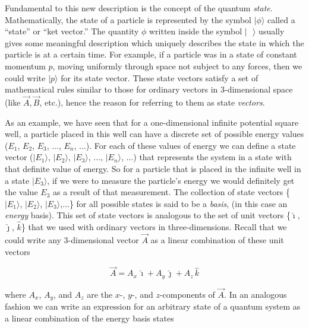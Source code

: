 Fundamental to this new description is the concept of the quantum {\em
state}.  Mathematically, the state of a particle is represented by the
symbol $|\mbox{$\phi$}\rangle$ called a ``state'' or ``ket vector.''
The quantity $\phi$ written inside the symbol $|\mbox{\ \ }\rangle$
usually gives some meaningful description which uniquely describes the
state in which the particle is at a certain time.  For example, if a
particle was in a state of constant momentum $p$, moving uniformly through
space not subject to any forces, then we could write $|\mbox{$p$}\rangle$
for its state vector. 
These state vectors satisfy a set of mathematical
rules similar to those for ordinary vectors in 3-dimensional space
(like $\vec{A}, \vec{B}$, etc.), hence the reason for referring to them
as state {\em vectors}.

As an example, we have seen that for a one-dimensional infinite potential
square well, a particle placed in this well can have a discrete set of
possible energy values ($E_1$, $E_2$, $E_3$, $\ldots$, $E_n$, $\ldots$).
For each of these values of energy we can define a state vector
($|\mbox{$E_1$}\rangle$, $|\mbox{$E_2$}\rangle$, $|\mbox{$E_3$}\rangle$,
$\ldots$, $|\mbox{$E_n$}\rangle$, $\ldots$) that represents the system
in a state with that definite value of energy.  So for a particle that
is placed in the infinite well in a state $|\mbox{$E_3$}\rangle$,
if we were to measure the particle's energy we would definitely get
the value $E_3$ as a result of that measurement.  The collection
of state vectors \{$|\mbox{$E_1$}\rangle$, $|\mbox{$E_2$}\rangle$,
$|\mbox{$E_3$}\rangle$,$\ldots$\} for all possible states is said to be
a {\em basis}, (in this case an {\em energy} basis).  This set of state
vectors is analogous to the set of unit vectors \{$\hat{\imath}$, 
$\hat{\jmath}$,
$\hat{k}$\} that we used with ordinary vectors in three-dimensions. Recall
that we could write any 3-dimensional vector $\vec{A}$ as a linear
combination of these unit vectors

\begin{equation}
\vec{A} = A_x\, \hat{\imath}  + A_y\, \hat{\jmath} + A_z\, \hat{k}
\end{equation}

\noindent where $A_x$, $A_y$, and $A_z$ are the $x$-, $y$-, and
$z$-components of $\vec{A}$.  In an analogous fashion we can write
an expression for an arbitrary state of a quantum system as a linear
combination of the energy basis states

